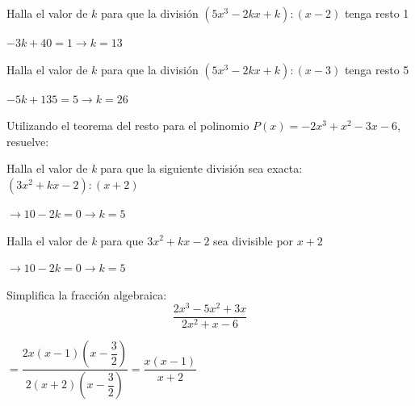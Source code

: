 \documentclass[addpoints,spanish, 12pt,a4paper]{exam}
\begin{document}
\begin{questions}
\addpoints

\question[1] Halla el valor de $k$ para que la división $\left( 5x^3-2kx+k \right): \left(x - 2\right)$  tenga resto 1
\begin{solution} $- 3 k + 40=1 \to k = 13 $ \end{solution}

\question[1] Halla el valor de $k$ para que la división $\left( 5x^3-2kx+k \right): \left(x - 3\right)$  tenga resto 5
\begin{solution} $- 5 k + 135=5 \to k = 26 $ \end{solution}

\addpoints


\question[1] Utilizando el teorema del resto para el polinomio $P(x)=-2x^3 + x^2 - 3x - 6$, resuelve: 

\addpoints


\question[1] Halla el valor de \emph{k} para que la siguiente división sea exacta: $(3x^2+kx-2):(x+2)$
\begin{solution} $\to 10-2k=0 \to k=5 $ \end{solution}


\question[1] Halla el valor de \emph{k} para que $3x^2+kx-2$ sea divisible por $x+2$
\begin{solution} $\to 10-2k=0 \to k=5 $ \end{solution}

\addpoints

\question[1] Simplifica la fracción algebraica: $$\dfrac{2x^3-5x^2+3x}{2x^2+x-6} $$
\begin{solution}$=\dfrac{2x\left(x-1\right)\left(x-\dfrac{3}{2}\right)}{2\left(x+2\right)\left(x-\dfrac{3}{2}\right)}=\dfrac{x(x-1)}{x+2}$  \end{solution}


\end{questions}
\end{document}
